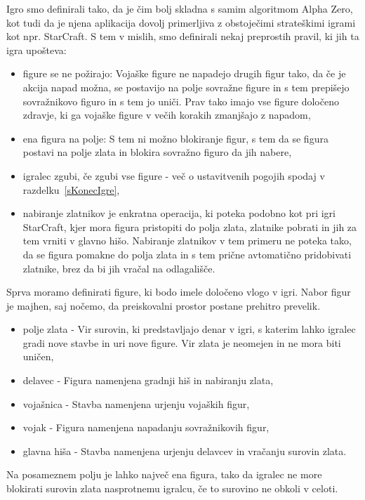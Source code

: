 \documentclass[a4paper, 12pt]{book}
\begin{document}
Igro smo definirali tako, da je čim bolj skladna s samim algoritmom Alpha Zero, kot tudi da je njena aplikacija dovolj primerljiva z obstoječimi strateškimi igrami kot npr. StarCraft.
S tem v mislih, smo definirali nekaj preprostih pravil, ki jih ta igra upošteva:
\begin{itemize}
	\item figure se ne požirajo: Vojaške figure ne napadejo drugih figur tako, da če je akcija napad možna, se postavijo na polje sovražne figure in s tem prepišejo sovražnikovo figuro in s tem jo uniči. 
	Prav tako imajo vse figure določeno zdravje, ki ga vojaške figure v večih korakih zmanjšajo z napadom,
	\item ena figura na polje: S tem ni možno blokiranje figur, s tem da se figura postavi na polje zlata in blokira sovražno figuro da jih nabere,
	\item igralec zgubi, če zgubi vse figure - več o ustavitvenih pogojih spodaj v razdelku~\ref{sKonecIgre},
	\item nabiranje zlatnikov je enkratna operacija, ki poteka podobno kot pri igri StarCraft, kjer mora figura pristopiti do polja zlata, zlatnike pobrati in jih za tem vrniti v glavno hišo.
	Nabiranje zlatnikov v tem primeru ne poteka tako, da se figura pomakne do polja zlata in s tem prične avtomatično pridobivati zlatnike, brez da bi jih vračal na odlagališče.

\end{itemize}


Sprva moramo definirati figure, ki bodo imele določeno vlogo v igri. Nabor figur je majhen, saj nočemo, da preiskovalni prostor postane prehitro prevelik.
\begin{itemize}
	\item polje zlata - Vir surovin, ki predstavljajo denar v igri, s katerim lahko igralec gradi nove stavbe in uri nove figure. Vir zlata je neomejen in ne mora biti uničen,
	\item delavec - Figura namenjena gradnji hiš in nabiranju zlata,
	\item vojašnica - Stavba namenjena urjenju vojaških figur,
	\item vojak - Figura namenjena napadanju sovražnikovih figur,
	\item glavna hiša - Stavba namenjena urjenju delavcev in vračanju surovin zlata.
\end{itemize}

Na posameznem polju je lahko največ ena figura, tako da igralec ne more blokirati surovin zlata nasprotnemu igralcu, če to surovino ne obkoli v celoti.
\end{document}
